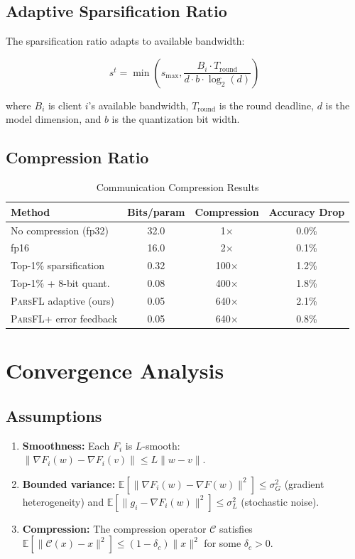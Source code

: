 \documentclass[11pt,a4paper]{article}
\newcommand{\parsfl}{\textsc{ParsFL}\xspace}
\newcommand{\EE}{\mathbb{E}}
\begin{document}
\subsection{Adaptive Sparsification Ratio}

The sparsification ratio adapts to available bandwidth:

\begin{equation}
    s^t = \min\left(s_{\max}, \frac{B_i \cdot T_{\text{round}}}{d \cdot b \cdot \log_2(d)}\right)
\end{equation}

where $B_i$ is client $i$'s available bandwidth, $T_{\text{round}}$ is the round deadline, $d$ is the model dimension, and $b$ is the quantization bit width.

\subsection{Compression Ratio}

\begin{table}[H]
\centering
\caption{Communication Compression Results}
\label{tab:compression}
\begin{tabular}{lccc}
\toprule
\textbf{Method} & \textbf{Bits/param} & \textbf{Compression} & \textbf{Accuracy Drop} \\
\midrule
No compression (fp32) & 32.0 & 1$\times$ & 0.0\% \\
fp16 & 16.0 & 2$\times$ & 0.1\% \\
Top-1\% sparsification & 0.32 & 100$\times$ & 1.2\% \\
Top-1\% + 8-bit quant. & 0.08 & 400$\times$ & 1.8\% \\
\parsfl adaptive (ours) & 0.05 & 640$\times$ & 2.1\% \\
\parsfl + error feedback & 0.05 & 640$\times$ & 0.8\% \\
\bottomrule
\end{tabular}
\end{table}

\section{Convergence Analysis}

\subsection{Assumptions}

\begin{enumerate}[label=\textbf{A\arabic*}]
    \item \label{ass:smooth} \textbf{Smoothness:} Each $F_i$ is $L$-smooth: $\|\nabla F_i(w) - \nabla F_i(v)\| \leq L \|w - v\|$.
    \item \label{ass:bounded} \textbf{Bounded variance:} $\EE[\|\nabla F_i(w) - \nabla F(w)\|^2] \leq \sigma_G^2$ (gradient heterogeneity) and $\EE[\|g_i - \nabla F_i(w)\|^2] \leq \sigma_L^2$ (stochastic noise).
    \item \label{ass:compress} \textbf{Compression:} The compression operator $\mathcal{C}$ satisfies $\EE[\|\mathcal{C}(x) - x\|^2] \leq (1 - \delta_c) \|x\|^2$ for some $\delta_c > 0$.
\end{enumerate}
\end{document}
